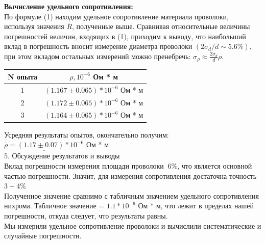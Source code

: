 \documentclass[12pt, a4paper]{article}
\begin{document}
\textbf{Вычисление удельного сопротивления:} \\
По формуле (1) находим удельное сопротивление материала проволоки, используя значения
$\overline{R}$, полученные выше. Сравнивая относительные величины погрешностей величин, входящих в
(1), приходим к выводу, что наибольший вклад в погрешность вносит измерение диаметра проволоки $(2\sigma_d/d ∼ 5.6\%)$, при этом вкладом остальных измерений можно пренебречь: $\sigma_{\rho} \approx \frac{2\sigma_d}{d} \rho$.
\begin{center}
    \begin{tabular}{ |c|c| } \hline
        N опыта & $\rho, 10^{-6}$ Ом * м \\ \hline
        1 & $(1.167 \pm 0.065) * 10^{-6}$ Ом * м \\ \hline
        2 & $(1.172 \pm 0.065) * 10^{-6}$ Ом * м \\ \hline
        3 & $(1.164 \pm 0.065) * 10^{-6}$ Ом * м \\ \hline
    \end{tabular}    
\end{center}

Усредняя результаты опытов, окончательно получим: \\
    $\underline{\overline{\rho} = (1.17 \pm 0.07) * 10^{-6}}$ Ом * м \\
    
    {\large 5. Обсуждение результатов и выводы \\}
    Вклад погрешности измерения площади проволоки $~6\%$, что является основной частью погрешности. Значит, для измерения сопротивления достаточна точность $3-4\%$ \\
    Полученное значение сравнимо с табличным значением удельного сопротивления нихрома. Табличное значение = $1.1 * 10^{-6}$ Ом * м, что лежит в пределах нашей погрешности, откуда следует, что результаты равны. \\
    Мы измерили удельное сопротивление проволоки и вычислили систематические и случайные погрешности.
\end{document}
